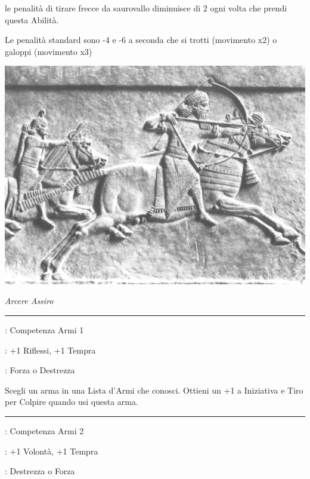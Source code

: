 \begin{multicols}{2}
le penalità di tirare frecce da saurovallo diminuisce di 2 ogni volta che prendi questa Abilità.

Le penalità standard sono -4 e -6 a seconda che si trotti (movimento x2) o galoppi (movimento x3)

\medskip

\begin{center}
\includegraphics[width=0.9\linewidth]{immagini/horsearcher.png}

\emph{Arcere Assiro}
\end{center}

\smallskip\noindent\rule{\linewidth}{2pt} \hypertarget{Arma Focalizzata}{}\medskip{}
\noindent
\begin{description}[noitemsep, topsep=0pt, parsep=0pt, partopsep=0pt, leftmargin=0cm, labelwidth=2.5cm]
    \item[\textbf{Requisito}]: Competenza Armi 1
    \item[\textbf{Tiri Salvezza}]: +1 Riflessi, +1 Tempra
    \item[\textbf{Caratteristica}]: Forza o Destrezza
\end{description}

Scegli un arma in una Lista d'Armi che conosci. Ottieni un +1 a Iniziativa e Tiro per Colpire quando usi questa arma.

\smallskip\noindent\rule{\linewidth}{2pt} \hypertarget{Artista dell'Arma}{}\medskip{}
\noindent
\begin{description}[noitemsep, topsep=0pt, parsep=0pt, partopsep=0pt, leftmargin=0cm, labelwidth=2.5cm]
    \item[\textbf{Requisito}]: Competenza Armi 2
    \item[\textbf{Tiri Salvezza}]: +1 Volontà, +1 Tempra
    \item[\textbf{Caratteristica}]: Destrezza o Forza
\end{description}


\end{multicols}
